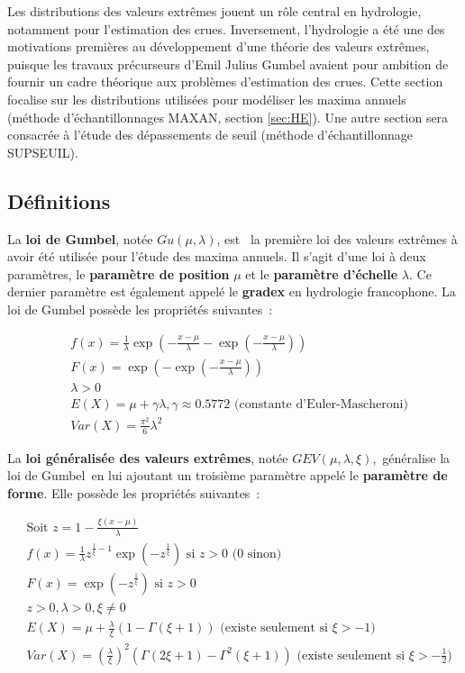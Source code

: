 \documentclass[
]{book}
\begin{document}
Les distributions des valeurs extrêmes jouent un rôle central en hydrologie, notamment pour l'estimation des crues. Inversement, l'hydrologie a été une des motivations premières au développement d'une théorie des valeurs extrêmes, puisque les travaux précurseurs d'Emil Julius Gumbel avaient pour ambition de fournir un cadre théorique aux problèmes d'estimation des crues. Cette section focalise sur les distributions utilisées pour modéliser les maxima annuels (méthode d'échantillonnages MAXAN, section \ref{sec:HE}). Une autre section sera consacrée à l'étude des dépassements de seuil (méthode d'échantillonnage SUPSEUIL).

\subsection{Définitions}\label{duxe9finitions}

La \textbf{loi de Gumbel}, notée \(Gu(\mu,\lambda)\), est ~la première loi des valeurs extrêmes à avoir été utilisée pour l'étude des maxima annuels. Il s'agit d'une loi à deux paramètres, le \textbf{paramètre de position} \(\mu\) et le \textbf{paramètre d'échelle} \(\lambda\). Ce dernier paramètre est également appelé le \textbf{gradex} en hydrologie francophone. La loi de Gumbel possède les propriétés suivantes~:

\begin{align}
&f(x)=\frac{1}{\lambda}\exp \left( -\frac{x-\mu}{\lambda} -\exp \left( -\frac{x-\mu}{\lambda} \right) \right) \\
&F(x)=\exp \left( - \exp \left( -\frac{x-\mu}{\lambda} \right) \right)\\
&\lambda >0 \\
&E(X)=\mu + \gamma \lambda, \gamma \approx 0.5772 \text{ (constante d'Euler-Mascheroni)}\\
&Var(X)=\frac{\pi^2}{6}\lambda^2
\label{eq:gumbel}
\end{align}

La \textbf{loi généralisée des valeurs extrêmes}, notée \(GEV(\mu,\lambda,\xi)\),~généralise la loi de Gumbel~en lui ajoutant un troisième paramètre appelé le \textbf{paramètre de forme}. Elle possède les propriétés suivantes~:

\begin{align}
&\text{Soit } z=1-\frac{\xi(x-\mu)}{\lambda} \\
&f(x)= \frac{1}{\lambda} z^{\frac{1}{\xi}-1} \exp \left( - z^{\frac{1}{\xi}}\right) \text{ si } z > 0 \text{ (0 sinon)}\\
&F(x)=\exp \left( - z^{\frac{1}{\xi}}\right) \text{ si } z > 0 \\
&z>0,\lambda >0,\xi \neq 0 \\
&E(X)=\mu + \frac{\lambda}{\xi} \left( 1-\Gamma(\xi+1)\right) \text{ (existe seulement si } \xi> -1 \text{)}\\
&Var(X)= \left(\frac{\lambda}{\xi}\right)^2 \left( \Gamma(2\xi+1)-\Gamma^2(\xi+1)\right) \text{ (existe seulement si } \xi> -\frac{1}{2} \text{)}
\label{eq:GEV}
\end{align}
\end{document}
